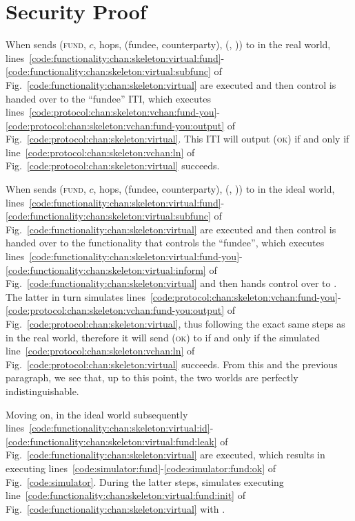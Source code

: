 \section{Security Proof}
  When \environment sends (\textsc{fund}, $c$, hops, (fundee, counterparty),
  (\charlie, \dave)) to \alice in the real world,
  lines~\ref{code:functionality:chan:skeleton:virtual:fund}-\ref{code:functionality:chan:skeleton:virtual:subfunc}
  of Fig.~\ref{code:functionality:chan:skeleton:virtual} are executed and then
  control is handed over to the ``fundee'' ITI, which executes
  lines~\ref{code:protocol:chan:skeleton:vchan:fund-you}-\ref{code:protocol:chan:skeleton:vchan:fund-you:output}
  of Fig.~\ref{code:protocol:chan:skeleton:virtual}.  This ITI will output
  (\textsc{ok}) if and only if line~\ref{code:protocol:chan:skeleton:vchan:ln}
  of Fig.~\ref{code:protocol:chan:skeleton:virtual} succeeds.

  When \environment sends (\textsc{fund}, $c$, hops, (fundee, counterparty),
  (\charlie, \dave)) to \alice in the ideal world,
  lines~\ref{code:functionality:chan:skeleton:virtual:fund}-\ref{code:functionality:chan:skeleton:virtual:subfunc}
  of Fig.~\ref{code:functionality:chan:skeleton:virtual} are executed and then
  control is handed over to the functionality that controls the ``fundee'',
  which executes
  lines~\ref{code:functionality:chan:skeleton:virtual:fund-you}-\ref{code:functionality:chan:skeleton:virtual:inform}
  of Fig.~\ref{code:functionality:chan:skeleton:virtual} and then hands control
  over to \simulator. The latter in turn simulates
  lines~\ref{code:protocol:chan:skeleton:vchan:fund-you}-\ref{code:protocol:chan:skeleton:vchan:fund-you:output}
  of Fig.~\ref{code:protocol:chan:skeleton:virtual}, thus following the exact
  same steps as in the real world, therefore it will send (\textsc{ok}) to
  \fchan if and only if the simulated
  line~\ref{code:protocol:chan:skeleton:vchan:ln} of
  Fig.~\ref{code:protocol:chan:skeleton:virtual} succeeds. From this and the
  previous paragraph, we see that, up to this point, the two worlds are
  perfectly indistinguishable.

  Moving on, in the ideal world subsequently
  lines~\ref{code:functionality:chan:skeleton:virtual:id}-\ref{code:functionality:chan:skeleton:virtual:fund:leak}
  of Fig.~\ref{code:functionality:chan:skeleton:virtual} are executed, which
  results in \simulator executing
  lines~\ref{code:simulator:fund}-\ref{code:simulator:fund:ok} of
  Fig.~\ref{code:simulator}. During the latter steps, \simulator simulates
  executing line~\ref{code:functionality:chan:skeleton:virtual:fund:init} of
  Fig.~\ref{code:functionality:chan:skeleton:virtual} with \alice.

